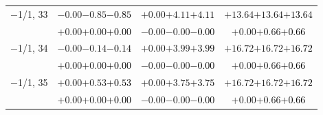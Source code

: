 \documentclass[compress]{beamer}
\begin{document}
\begin{frame}
\begin{tabular}{r | c | c | c}
$-$1/1, 33 & $-0.00$\hspace{0.1 cm}$-0.85$\hspace{0.1 cm}\textcolor{black}{$-0.85$} & $+0.00$\hspace{0.1 cm}$+4.11$\hspace{0.1 cm}\textcolor{black}{$+4.11$} & $+13.64$\hspace{0.1 cm}$+13.64$\hspace{0.1 cm}\textcolor{black}{$+13.64$} \\
           & $+0.00$\hspace{0.1 cm}$+0.00$\hspace{0.1 cm}\textcolor{black}{$+0.00$} & $-0.00$\hspace{0.1 cm}$-0.00$\hspace{0.1 cm}\textcolor{black}{$-0.00$} & $+0.00$\hspace{0.1 cm}$+0.66$\hspace{0.1 cm}\textcolor{black}{$+0.66$} \\
$-$1/1, 34 & $-0.00$\hspace{0.1 cm}$-0.14$\hspace{0.1 cm}\textcolor{black}{$-0.14$} & $+0.00$\hspace{0.1 cm}$+3.99$\hspace{0.1 cm}\textcolor{black}{$+3.99$} & $+16.72$\hspace{0.1 cm}$+16.72$\hspace{0.1 cm}\textcolor{black}{$+16.72$} \\
           & $+0.00$\hspace{0.1 cm}$+0.00$\hspace{0.1 cm}\textcolor{black}{$+0.00$} & $-0.00$\hspace{0.1 cm}$-0.00$\hspace{0.1 cm}\textcolor{black}{$-0.00$} & $+0.00$\hspace{0.1 cm}$+0.66$\hspace{0.1 cm}\textcolor{black}{$+0.66$} \\
$-$1/1, 35 & $+0.00$\hspace{0.1 cm}$+0.53$\hspace{0.1 cm}\textcolor{black}{$+0.53$} & $+0.00$\hspace{0.1 cm}$+3.75$\hspace{0.1 cm}\textcolor{black}{$+3.75$} & $+16.72$\hspace{0.1 cm}$+16.72$\hspace{0.1 cm}\textcolor{black}{$+16.72$} \\
           & $+0.00$\hspace{0.1 cm}$+0.00$\hspace{0.1 cm}\textcolor{black}{$+0.00$} & $-0.00$\hspace{0.1 cm}$-0.00$\hspace{0.1 cm}\textcolor{black}{$-0.00$} & $+0.00$\hspace{0.1 cm}$+0.66$\hspace{0.1 cm}\textcolor{black}{$+0.66$} \\

\end{tabular}
\end{frame}
\end{document}
